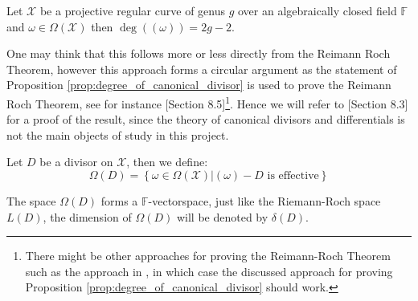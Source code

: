 \begin{proposition}\label{prop:degree_of_canonical_divisor}
  Let $\mathcal{X}$ be a projective regular curve of genus $g$ over an algebraically closed field $\mathbb{F}$ and $\omega \in \Omega(\mathcal{X})$ then $\deg((\omega)) = 2g - 2$.
\end{proposition}
One may think that this follows more or less directly from the Reimann Roch Theorem, however this approach forms a circular argument as the statement of Proposition \ref{prop:degree_of_canonical_divisor} is used to prove the Reimann Roch Theorem, see for instance \cite{Fulton}[Section 8.5]\footnote{There might be other approaches for proving the Reimann-Roch Theorem such as the approach in \cite{aff_and_codes}, in which case the discussed approach for proving Proposition \ref{prop:degree_of_canonical_divisor} should work.}. Hence we will refer to \cite{Fulton}[Section 8.3] for a proof of the result, since the theory of canonical divisors and differentials is not the main objects of study in this project.


\begin{definition}
  Let $D$ be a divisor on $\mathcal{X}$, then we define:
  \begin{equation*}
    \Omega(D) = \left\{\omega \in \Omega(\mathcal{X}) | (\omega) - D \text{ is effective} \right\}
  \end{equation*}
\end{definition}
The space $\Omega(D)$ forms a $\mathbb{F}$-vectorspace, just like the Riemann-Roch space $L(D)$, the dimension of $\Omega(D)$ will be denoted by $\delta(D)$.
